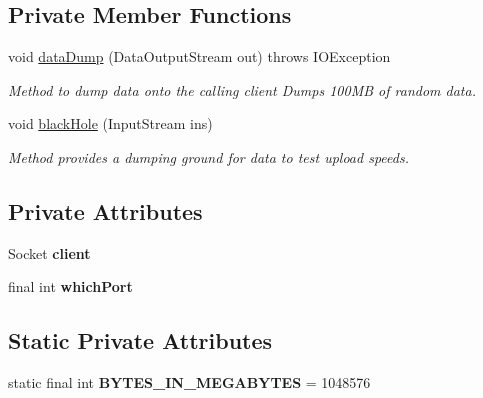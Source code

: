 \subsection*{Private Member Functions}
\begin{DoxyCompactItemize}
\item 
void \hyperlink{classcom_1_1server_1_1HandleTCP_aa9343d9503bbc43f40bab5a0eb309c2b}{data\-Dump} (Data\-Output\-Stream out)  throws I\-O\-Exception 
\begin{DoxyCompactList}\small\item\em Method to dump data onto the calling client Dumps 100\-M\-B of random data. \end{DoxyCompactList}\item 
void \hyperlink{classcom_1_1server_1_1HandleTCP_ab5dfcf570b2f843569c96c2ee461839c}{black\-Hole} (Input\-Stream ins)
\begin{DoxyCompactList}\small\item\em Method provides a dumping ground for data to test upload speeds. \end{DoxyCompactList}\end{DoxyCompactItemize}
\subsection*{Private Attributes}
\begin{DoxyCompactItemize}
\item 
\hypertarget{classcom_1_1server_1_1HandleTCP_a5ecfa869e35d742ad0a43421578ce3f8}{Socket {\bfseries client}}\label{classcom_1_1server_1_1HandleTCP_a5ecfa869e35d742ad0a43421578ce3f8}

\item 
\hypertarget{classcom_1_1server_1_1HandleTCP_aad0c50ffed85d5f4fa3a4c91f893b23a}{final int {\bfseries which\-Port}}\label{classcom_1_1server_1_1HandleTCP_aad0c50ffed85d5f4fa3a4c91f893b23a}

\end{DoxyCompactItemize}
\subsection*{Static Private Attributes}
\begin{DoxyCompactItemize}
\item 
\hypertarget{classcom_1_1server_1_1HandleTCP_ad068267a7062ccee4b5c33cca5c6a42b}{static final int {\bfseries B\-Y\-T\-E\-S\-\_\-\-I\-N\-\_\-\-M\-E\-G\-A\-B\-Y\-T\-E\-S} = 1048576}\label{classcom_1_1server_1_1HandleTCP_ad068267a7062ccee4b5c33cca5c6a42b}

\end{DoxyCompactItemize}


